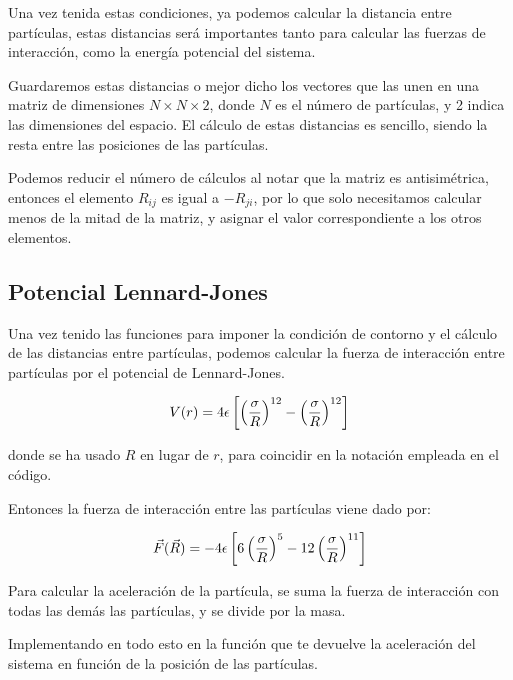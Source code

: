 \documentclass[11pt, twoside]{article} %
\begin{document}
Una vez tenida estas condiciones, ya podemos calcular la distancia entre partículas,
estas distancias será importantes tanto para calcular las fuerzas de interacción, como 
la energía potencial del sistema. 

Guardaremos estas distancias o mejor dicho los vectores que las unen en una matriz 
de dimensiones $N\times N\times 2$, donde $N$ es el número de partículas, y 2 indica
las dimensiones del espacio. El cálculo de estas distancias es sencillo, siendo la
resta entre las posiciones de las partículas. 

Podemos reducir el número de cálculos al notar que la matriz es antisimétrica, entonces el 
elemento $R_{ij}$ es igual a $-R_{ji}$, por lo que solo necesitamos calcular menos de 
la mitad de la matriz, y asignar el valor correspondiente a los otros elementos.

\subsection{Potencial Lennard-Jones}

Una vez tenido las funciones para imponer la condición de contorno y el cálculo de 
las distancias entre partículas, podemos calcular la fuerza de interacción entre 
partículas por el potencial de Lennard-Jones.

\begin{equation}
    V(r) = 4\epsilon\left[\left(\frac{\sigma}{R}\right)^{12}-
        \left(\frac{\sigma}{R}\right)^{12}\right]
    \label{eq:Lennard_Jones_potential}
\end{equation}

donde se ha usado $R$ en lugar de $r$, para coincidir en la notación empleada en 
el código.

\vspace{3mm}

Entonces la fuerza de interacción entre las partículas viene dado por:

\begin{equation}
    \vec{F}(\vec{R}) =  - 4\epsilon\left[6\left(\frac{\sigma}{R}\right)^{5}-
    12\left(\frac{\sigma}{R}\right)^{11}\right]
\end{equation}

Para calcular la aceleración de la partícula, se suma la fuerza de interacción con
todas las demás las partículas, y se divide por la masa.

Implementando en todo esto en la función que te devuelve la aceleración del sistema
en función de la posición de las partículas.
\end{document}
